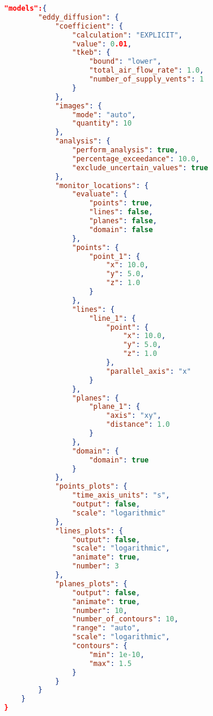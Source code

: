 \begin{lstlisting}[language=json,firstnumber=1]
    "models":{
        "eddy_diffusion": {
            "coefficient": {
                "calculation": "EXPLICIT",
                "value": 0.01,
                "tkeb": {
                    "bound": "lower",
                    "total_air_flow_rate": 1.0,
                    "number_of_supply_vents": 1
                }
            },
            "images": {
                "mode": "auto",
                "quantity": 10
            },
            "analysis": {
                "perform_analysis": true,
                "percentage_exceedance": 10.0,
                "exclude_uncertain_values": true 
            },
            "monitor_locations": {
                "evaluate": {
                    "points": true,
                    "lines": false,
                    "planes": false,
                    "domain": false
                },
                "points": {
                    "point_1": {
                        "x": 10.0,
                        "y": 5.0,
                        "z": 1.0
                    }
                },
                "lines": {
                    "line_1": {
                        "point": {
                            "x": 10.0,
                            "y": 5.0,
                            "z": 1.0 
                        },
                        "parallel_axis": "x"
                    }
                },
                "planes": {
                    "plane_1": {
                        "axis": "xy",
                        "distance": 1.0
                    }
                },
                "domain": {
                    "domain": true 
                }
            },
            "points_plots": {
                "time_axis_units": "s",
                "output": false,
                "scale": "logarithmic"
            },
            "lines_plots": {
                "output": false,
                "scale": "logarithmic",
                "animate": true,
                "number": 3 
            },
            "planes_plots": {
                "output": false,
                "animate": true,
                "number": 10,
                "number_of_contours": 10,
                "range": "auto",
                "scale": "logarithmic",
                "contours": {
                    "min": 1e-10,
                    "max": 1.5
                }
            }
        }
    }
}
\end{lstlisting}

